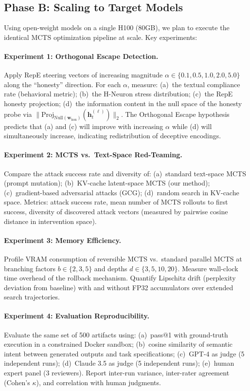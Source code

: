 \documentclass{article}
\begin{document}
\subsection{Phase B: Scaling to Target Models}

Using open-weight models on a single H100 (80GB), we plan to execute the identical MCTS optimization pipeline at scale. Key experiments:

\paragraph{Experiment 1: Orthogonal Escape Detection.}
Apply RepE steering vectors of increasing magnitude $\alpha \in \{0.1, 0.5, 1.0, 2.0, 5.0\}$ along the ``honesty'' direction. For each $\alpha$, measure: (a)~the textual compliance rate (behavioral metric); (b)~the H-Neuron stress distribution; (c)~the RepE honesty projection; (d)~the information content in the null space of the honesty probe via $\|\text{Proj}_{\text{Null}(\mathbf{w}_{\text{hon}})}(\mathbf{h}_t^{(\ell)})\|_2$. The Orthogonal Escape hypothesis predicts that (a) and (c) will improve with increasing $\alpha$ while (d) will simultaneously increase, indicating redistribution of deceptive encodings.

\paragraph{Experiment 2: MCTS vs.\ Text-Space Red-Teaming.}
Compare the attack success rate and diversity of: (a)~standard text-space MCTS (prompt mutation); (b)~KV-cache latent-space MCTS (our method); (c)~gradient-based adversarial attacks (GCG); (d)~random search in KV-cache space. Metrics: attack success rate, mean number of MCTS rollouts to first success, diversity of discovered attack vectors (measured by pairwise cosine distance in intervention space).

\paragraph{Experiment 3: Memory Efficiency.}
Profile VRAM consumption of reversible MCTS vs.\ standard parallel MCTS at branching factors $b \in \{2, 3, 5\}$ and depths $d \in \{3, 5, 10, 20\}$. Measure wall-clock time overhead of the rollback mechanism. Quantify Lipschitz drift (perplexity deviation from baseline) with and without FP32 accumulators over extended search trajectories.

\paragraph{Experiment 4: Evaluation Reproducibility.}
Evaluate the same set of 500 artifacts using: (a)~pass@1 with ground-truth execution in a constrained Docker sandbox; (b)~cosine similarity of semantic intent between generated outputs and task specifications; (c)~GPT-4 as judge (5 independent runs); (d)~Claude 3.5 as judge (5 independent runs); (e)~human expert panel (3 reviewers). Report inter-run variance, inter-rater agreement (Cohen's $\kappa$), and correlation with human judgments.
\end{document}
